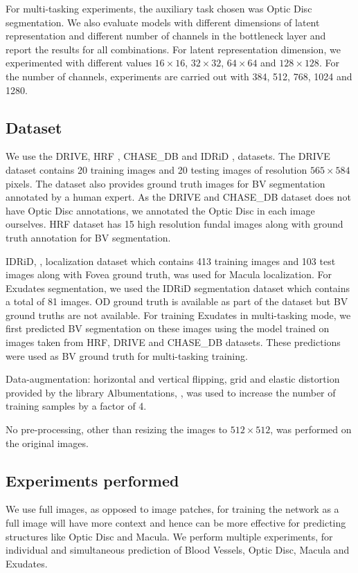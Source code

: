 \documentclass[utf8]{FrontiersinHarvard} %
\begin{document}
For multi-tasking experiments, the auxiliary task chosen was Optic Disc segmentation. We also evaluate models with different dimensions of latent representation and different number of channels  in the bottleneck layer and report the results for all combinations. For latent representation dimension, we experimented with different values $16\times16$, $32\times32$, $64\times64$ and $128\times128$. For the number of channels, experiments are carried out with 384, 512, 768, 1024 and 1280.

\subsection{Dataset}
We use the DRIVE, HRF \cite{budai2013robust}, CHASE\_DB and IDRiD \cite{h25w98-18}, datasets. The DRIVE dataset contains 20 training images and 20 testing images of resolution $565 \times 584$ pixels. The dataset also provides ground truth images for BV segmentation annotated by a human expert. As the DRIVE and CHASE\_DB dataset does not have Optic Disc annotations, we annotated the Optic Disc in each image ourselves. HRF dataset has 15 high resolution fundal images along with ground truth annotation for BV segmentation.

IDRiD, \cite{h25w98-18}, localization dataset which contains 413 training images and 103 test images along with Fovea ground truth, was used for Macula localization. For Exudates segmentation, we used the IDRiD segmentation dataset which contains a total of 81 images. OD ground truth is available as part of the dataset but BV ground truths are not available. For training Exudates in multi-tasking mode, we first predicted BV segmentation on these images using the model trained on images taken from HRF, DRIVE and CHASE\_DB datasets. These  predictions were used as BV ground truth for multi-tasking training.

Data-augmentation: horizontal and vertical flipping, grid and elastic distortion provided by the library Albumentations, \cite{buslaev2020albumentations}, was used  to increase the number of training samples by a factor of 4.

No pre-processing, other than resizing the images to $512\times512$, was performed on the original images.

\subsection{Experiments performed}
We use full images, as opposed to image patches, for training the network  as a full image will have more context and hence can be more effective for predicting structures like Optic Disc and Macula. We perform multiple experiments, for individual and simultaneous prediction of Blood Vessels, Optic Disc, Macula and Exudates.
\end{document}
